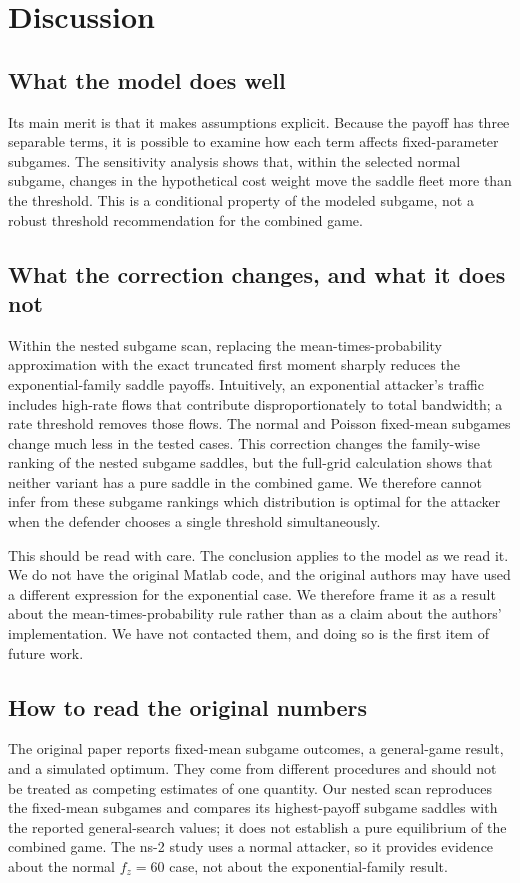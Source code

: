 \documentclass[conference]{IEEEtran}
\begin{document}
\section{Discussion}\label{sec:disc}

\subsection{What the model does well}
Its main merit is that it makes assumptions explicit. Because the payoff has three separable terms, it is possible to examine how each term affects fixed-parameter subgames. The sensitivity analysis shows that, within the selected normal subgame, changes in the hypothetical cost weight move the saddle fleet more than the threshold. This is a conditional property of the modeled subgame, not a robust threshold recommendation for the combined game.

\subsection{What the correction changes, and what it does not}
Within the nested subgame scan, replacing the mean-times-probability approximation with the exact truncated first moment sharply reduces the exponential-family saddle payoffs. Intuitively, an exponential attacker's traffic includes high-rate flows that contribute disproportionately to total bandwidth; a rate threshold removes those flows. The normal and Poisson fixed-mean subgames change much less in the tested cases. This correction changes the family-wise ranking of the nested subgame saddles, but the full-grid calculation shows that neither variant has a pure saddle in the combined game. We therefore cannot infer from these subgame rankings which distribution is optimal for the attacker when the defender chooses a single threshold simultaneously.

This should be read with care. The conclusion applies to the model as we read it. We do not have the original Matlab code, and the original authors may have used a different expression for the exponential case. We therefore frame it as a result about the mean-times-probability rule rather than as a claim about the authors' implementation. We have not contacted them, and doing so is the first item of future work.

\subsection{How to read the original numbers}
The original paper reports fixed-mean subgame outcomes, a general-game result, and a simulated optimum. They come from different procedures and should not be treated as competing estimates of one quantity. Our nested scan reproduces the fixed-mean subgames and compares its highest-payoff subgame saddles with the reported general-search values; it does not establish a pure equilibrium of the combined game. The ns-2 study uses a normal attacker, so it provides evidence about the normal $f_z{=}60$ case, not about the exponential-family result.
\end{document}
